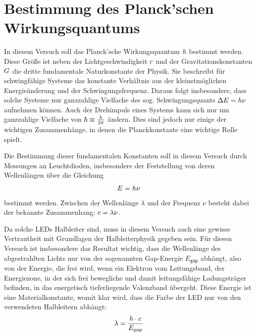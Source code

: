 \chapter{Bestimmung des Planck'schen Wirkungsquantums}
In diesem Versuch soll das Planck'sche Wirkungsquantum $h$ bestimmt werden. Diese Größe ist neben der Lichtgeschwindigkeit $c$ und der Gravitationskonstanten $G$ die dritte fundamentale Naturkonstante der Physik. Sie beschreibt für schwingfähige Systeme das konstante Verhältnis aus der kleinstmöglichen Energieänderung und der Schwingungsfrequenz. Daraus folgt insbesondere, dass solche Systeme nur ganzzahlige Vielfache des sog. Schwingungsquants $\Delta E=h\nu$ aufnehmen können. Auch der Drehimpuls eines Systems kann sich nur um ganzzahlige Vielfache von $\hbar\equiv\frac{h}{2\pi}$ ändern. Dies sind jedoch nur einige der wichtigen Zusammenhänge, in denen die Planckkonstante eine wichtige Rolle spielt.

Die Bestimmung dieser fundamentalen Konstanten soll in diesem Versuch durch Messungen an Leuchtdioden, insbesondere der Feststellung von deren Wellenlängen über die Gleichung 
\begin{equation}
	E=h\nu
\end{equation}
bestimmt werden. Zwischen der Wellenlänge $\lambda$ und der Frequenz $\nu$ besteht dabei der bekannte Zusammenhang: $c=\lambda\nu$.

Da solche LEDs Halbleiter sind, muss in diesem Versuch auch eine gewisse Vertrautheit mit Grundlagen der Halbleiterphysik gegeben sein. Für diesen Versuch ist insbesondere das Resultat wichtig, dass die Wellenlänge des abgestrahlten Lichts nur von der sogenannten Gap-Energie $E_{\mathtt{gap}}$ abhängt, also von der Energie, die frei wird, wenn ein Elektron vom Leitungsband, der Energiezone, in der sich frei bewegliche und damit leitungsfähige Ladungsträger befinden, in das energetisch tieferliegende Valenzband übergeht. Diese Energie ist eine Materialkonstante, womit klar wird, dass die Farbe der LED nur von den verwendeten Halbleitern abhängt:
\begin{equation}
	\lambda=\frac{h\cdot c}{E_{\mathrm{gap}}}
\end{equation}
